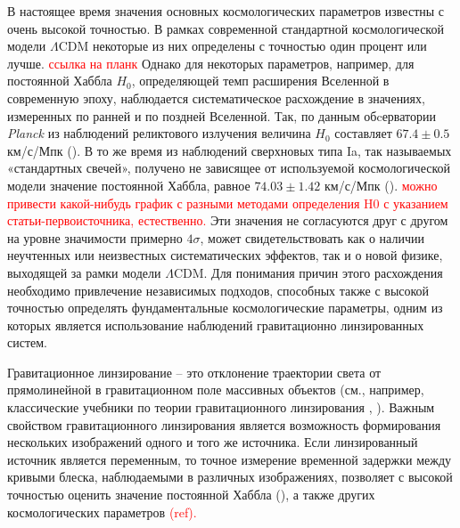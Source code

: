 В настоящее время значения основных космологических параметров известны с очень высокой точностью. В рамках современной стандартной космологической модели $\Lambda$CDM некоторые из них определены с точностью один процент или лучше. \textcolor{red}{ссылка на планк} Однако для некоторых параметров, например, для постоянной Хаббла $H_0$, определяющей  темп расширения Вселенной в современную эпоху, 
наблюдается систематическое расхождение в значениях,  измеренных по ранней и по поздней Вселенной. Так, по данным обcерватории \textit{Planck} из наблюдений реликтового излучения величина $H_0$ составляет $67.4 \pm 0.5$ км/с/Мпк (\cite{planck2018}). В то же время из наблюдений сверхновых типа Ia, так называемых «стандартных свечей», получено не зависящее от используемой космологической модели значение постоянной Хаббла, равное $74.03 \pm 1.42$ км/с/Мпк (\cite{riess2019}). \textcolor{red}{можно привести какой-нибудь график с разными методами определения H0 с указанием статьи-первоисточника, естественно.} Эти значения не согласуются друг с другом на уровне значимости примерно $4\sigma$, может свидетельствовать как о наличии неучтенных или неизвестных систематических эффектов, так и о новой физике, выходящей за рамки модели $\Lambda$CDM. Для понимания причин этого расхождения необходимо привлечение независимых подходов, способных также с высокой точностью определять фундаментальные космологические параметры, одним из которых является использование наблюдений гравитационно линзированных систем.

Гравитационное линзирование -- это отклонение  траектории света от прямолинейной в гравитационном поле массивных объектов (см., например, классические учебники по теории гравитационного линзирования \cite{schneider1992}, \cite{gravlensbook}). Важным свойством гравитационного линзирования является возможность формирования нескольких изображений одного и того же источника. Если линзированный источник является переменным, то точное измерение временной задержки между кривыми блеска, наблюдаемыми в различных изображениях, позволяет с высокой точностью оценить значение постоянной Хаббла (\cite{timedelaycosmography}),  а также других космологических параметров \textcolor{red}{(ref).}

